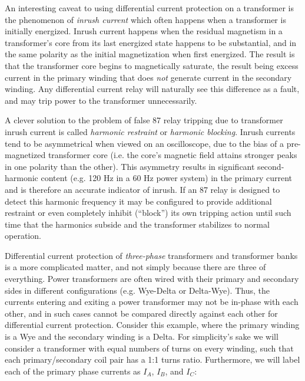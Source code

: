 \vskip 10pt

\filbreak

An interesting caveat to using differential current protection on a transformer is the phenomenon of \textit{inrush current} which often happens when a transformer is initially energized.  Inrush current happens when the residual magnetism in a transformer's core from its last energized state happens to be substantial, and in the same polarity as the initial magnetization when first energized.  The result is that the transformer core begins to magnetically saturate, the result being excess current in the primary winding that does \textit{not} generate current in the secondary winding.  Any differential current relay will naturally see this difference as a fault, and may trip power to the transformer unnecessarily.

A clever solution to the problem of false 87 relay tripping due to transformer inrush current is called \textit{harmonic restraint} or \textit{harmonic blocking}.  Inrush currents tend to be asymmetrical when viewed on an oscilloscope, due to the bias of a pre-magnetized transformer core (i.e. the core's magnetic field attains stronger peaks in one polarity than the other).  This asymmetry results in significant second-harmonic content (e.g. 120 Hz in a 60 Hz power system) in the primary current and is therefore an accurate indicator of inrush.  If an 87 relay is designed to detect this harmonic frequency it may be configured to provide additional restraint or even completely inhibit (``block'') its own tripping action until such time that the harmonics subside and the transformer stabilizes to normal operation.    

\vskip 10pt

\filbreak

Differential current protection of \textit{three-phase} transformers and transformer banks is a more complicated matter, and not simply because there are three of everything.  Power transformers are often wired with their primary and secondary sides in different configurations (e.g. Wye-Delta or Delta-Wye).  Thus, the currents entering and exiting a power transformer may not be in-phase with each other, and in such cases cannot be compared directly against each other for differential current protection.  Consider this example, where the primary winding is a Wye and the secondary winding is a Delta.  For simplicity's sake we will consider a transformer with equal numbers of turns on every winding, such that each primary/secondary coil pair has a 1:1 turns ratio.  Furthermore, we will label each of the primary phase currents as $I_A$, $I_B$, and $I_C$:

